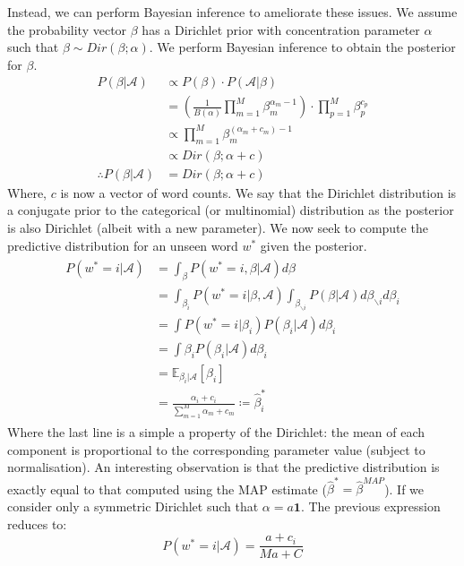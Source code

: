 \documentclass[]{article}
\newcommand{\Acal}{\mathcal{A}}
\newcommand{\Expect}{\mathbb{E}}
\begin{document}
Instead, we can perform Bayesian inference to ameliorate these issues. We assume the probability vector $\beta$ has a Dirichlet prior with concentration parameter $\alpha$ such that $\beta \sim Dir(\beta ; \alpha)$. We perform Bayesian inference to obtain the posterior for $\beta$.
%
\begin{align}
	P(\beta | \Acal) &\propto P(\beta) \cdot P(\Acal | \beta) \nonumber \\
	&= \left( \frac{1}{B(\alpha)} \prod_{m = 1}^{M} \beta_m^{\alpha_m -1} \right) \cdot \prod_{p=1}^{M} \beta_p^{c_p} \nonumber \\
	&\propto \prod_{m = 1}^{M} \beta_m^{(\alpha_m + c_m) -1} \nonumber \\
	&\propto Dir(\beta ; \alpha + c) \nonumber \\
	\therefore P(\beta | \Acal) &= Dir(\beta ; \alpha + c)
	\label{eqn:posterior}
\end{align}
%
Where, $c$ is now a vector of word counts. We say that the Dirichlet distribution is a conjugate prior to the categorical (or multinomial) distribution as the posterior is also Dirichlet (albeit with a new parameter). We now seek to compute the predictive distribution for an unseen word $w^*$ given the posterior.
%
\begin{align}
\begin{split}
	P(w^* = i | \Acal) &= \int_{\beta} P(w^* = i, \beta | \Acal) d\beta \\
	&= \int_{\beta_i} P(w^* = i | \beta , \Acal) \int_{\beta_{\backslash i}} P(\beta | \Acal) d\beta_{\backslash i} d\beta_i \\
	&= \int P(w^* = i | \beta_i) P(\beta_i | \Acal) d\beta_i \\
	&= \int \beta_i P(\beta_i | \Acal) d\beta_i \\
	&= \Expect_{\beta_i | \Acal} [\beta_i] \\
	&= \frac{\alpha_i + c_i}{\sum_{m=1}^{M} \alpha_m + c_m} \coloneqq \hat{\beta}^*_i
\end{split}
\label{eqn:bayes-pred}
\end{align}
%
Where the last line is a simple a property of the Dirichlet: the mean of each component is proportional to the corresponding parameter value (subject to normalisation). An interesting observation is that the predictive distribution is exactly equal to that computed using the MAP estimate ($\hat{\beta}^* = \hat{\beta}^{MAP}$). If we consider only a symmetric Dirichlet such that $\alpha = a \mathbf{1}$. The previous expression reduces to:
%
\begin{equation}
	P(w^* = i | \Acal) = \frac{a + c_i}{Ma + C}
	\label{eqn:pred-bayes}
\end{equation}
\end{document}
